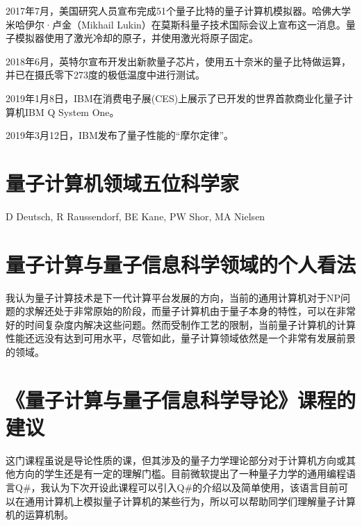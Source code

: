 \documentclass{article}
\begin{document}
2017年7月，美国研究人员宣布完成51个量子比特的量子计算机模拟器。哈佛大学米哈伊尔·卢金（Mikhail Lukin）在莫斯科量子技术国际会议上宣布这一消息。量子模拟器使用了激光冷却的原子，并使用激光将原子固定。

2018年6月，英特尔宣布开发出新款量子芯片，使用五十奈米的量子比特做运算，并已在摄氏零下273度的极低温度中进行测试。

2019年1月8日，IBM在消费电子展(CES)上展示了已开发的世界首款商业化量子计算机IBM Q System One。

2019年3月12日，IBM发布了量子性能的“摩尔定律”。

\section{量子计算机领域五位科学家}
D Deutsch, R Raussendorf, BE Kane, PW Shor, MA Nielsen

\section{量子计算与量子信息科学领域的个人看法}
我认为量子计算技术是下一代计算平台发展的方向，当前的通用计算机对于NP问题的求解还处于非常原始的阶段，而量子计算机由于量子本身的特性，可以在非常好的时间复杂度内解决这些问题。然而受制作工艺的限制，当前量子计算机的计算性能还远没有达到可用水平，尽管如此，量子计算领域依然是一个非常有发展前景的领域。

\section{《量子计算与量子信息科学导论》课程的建议}
这门课程虽说是导论性质的课，但其涉及的量子力学理论部分对于计算机方向或其他方向的学生还是有一定的理解门槛。目前微软提出了一种量子力学的通用编程语言Q\#，我认为下次开设此课程可以引入Q\#的介绍以及简单使用，该语言目前可以在通用计算机上模拟量子计算机的某些行为，所以可以帮助同学们理解量子计算机的运算机制。
\end{document}
